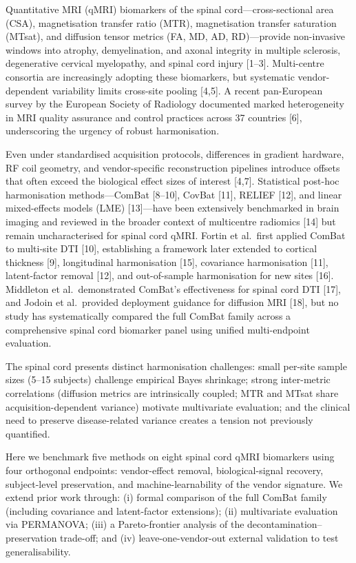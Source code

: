 \documentclass[12pt,a4paper]{article}
\begin{document}
Quantitative MRI (qMRI) biomarkers of the spinal cord---cross-sectional area (CSA), magnetisation transfer ratio (MTR), magnetisation transfer saturation (MTsat), and diffusion tensor metrics (FA, MD, AD, RD)---provide non-invasive windows into atrophy, demyelination, and axonal integrity in multiple sclerosis, degenerative cervical myelopathy, and spinal cord injury [1--3]. Multi-centre consortia are increasingly adopting these biomarkers, but systematic vendor-dependent variability limits cross-site pooling [4,5]. A recent pan-European survey by the European Society of Radiology documented marked heterogeneity in MRI quality assurance and control practices across 37 countries [6], underscoring the urgency of robust harmonisation.

Even under standardised acquisition protocols, differences in gradient hardware, RF coil geometry, and vendor-specific reconstruction pipelines introduce offsets that often exceed the biological effect sizes of interest [4,7]. Statistical post-hoc harmonisation methods---ComBat [8--10], CovBat [11], RELIEF [12], and linear mixed-effects models (LME) [13]---have been extensively benchmarked in brain imaging and reviewed in the broader context of multicentre radiomics [14] but remain uncharacterised for spinal cord qMRI. Fortin et al.\ first applied ComBat to multi-site DTI [10], establishing a framework later extended to cortical thickness [9], longitudinal harmonisation [15], covariance harmonisation [11], latent-factor removal [12], and out-of-sample harmonisation for new sites [16]. Middleton et al.\ demonstrated ComBat's effectiveness for spinal cord DTI [17], and Jodoin et al.\ provided deployment guidance for diffusion MRI [18], but no study has systematically compared the full ComBat family across a comprehensive spinal cord biomarker panel using unified multi-endpoint evaluation.

The spinal cord presents distinct harmonisation challenges: small per-site sample sizes (5--15 subjects) challenge empirical Bayes shrinkage; strong inter-metric correlations (diffusion metrics are intrinsically coupled; MTR and MTsat share acquisition-dependent variance) motivate multivariate evaluation; and the clinical need to preserve disease-related variance creates a tension not previously quantified.

Here we benchmark five methods on eight spinal cord qMRI biomarkers using four orthogonal endpoints: vendor-effect removal, biological-signal recovery, subject-level preservation, and machine-learnability of the vendor signature. We extend prior work through: (i) formal comparison of the full ComBat family (including covariance and latent-factor extensions); (ii) multivariate evaluation via PERMANOVA; (iii) a Pareto-frontier analysis of the decontamination--preservation trade-off; and (iv) leave-one-vendor-out external validation to test generalisability.
\end{document}
